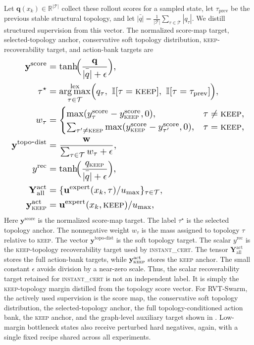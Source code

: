 \documentclass{ieeeaccess}
\DeclareMathOperator*{\argmax}{arg\,max}
\newcommand{\R}{\mathbb{R}}
\newcommand{\cT}{\mathcal{T}}
\newcommand{\bfu}{\mathbf{u}}
\begin{document}
Let $\mathbf{q}(x_k)\in\R^{|\cT|}$ collect these rollout scores for a sampled state, let $\tau_{\mathrm{prev}}$ be the previous stable structural topology, and let $\bar{|q|}=\frac{1}{|\cT|}\sum_{\tau\in\cT}|q_\tau|$. We distill structured supervision from this vector. The normalized score-map target, selected-topology anchor, conservative soft topology distribution, \textsc{keep}-recoverability target, and action-bank targets are
\begin{equation}
\resizebox{0.98\columnwidth}{!}{$\displaystyle
\begin{aligned}
\mathbf{y}^{\mathrm{score}}
&= \tanh\!\Bigl(\frac{\mathbf{q}}{\bar{|q|}+\epsilon}\Bigr), \\
\tau^\star &= \argmax_{\tau\in\cT}^{\mathrm{lex}}
\Bigl(q_\tau,\ \mathbb{I}[\tau=\textsc{keep}],\ \mathbb{I}[\tau=\tau_{\mathrm{prev}}]\Bigr), \\
w_\tau &=
\begin{cases}
\max(y^{\mathrm{score}}_\tau - y^{\mathrm{score}}_{\textsc{keep}}, 0), & \tau \neq \textsc{keep},\\
\sum_{\tau' \neq \textsc{keep}} \max(y^{\mathrm{score}}_{\textsc{keep}} - y^{\mathrm{score}}_{\tau'}, 0), & \tau = \textsc{keep},
\end{cases} \\
\mathbf{y}^{\mathrm{topo\mbox{-}dist}}
&= \frac{\mathbf{w}}{\sum_{\tau\in\cT} w_\tau + \epsilon}, \\
y^{\mathrm{rec}}
&= \tanh\!\Bigl(\frac{q_{\textsc{keep}}}{\bar{|q|}+\epsilon}\Bigr), \\
\mathbf{Y}^{\mathrm{act}}_{\mathrm{all}}
&= \{\bfu^{\mathrm{expert}}(x_k,\tau)/u_{\max}\}_{\tau\in\cT}, \\
\mathbf{y}^{\mathrm{act}}_{\textsc{keep}}
&= \bfu^{\mathrm{expert}}(x_k,\textsc{keep}) / u_{\max},
\label{eq:targets}
\end{aligned}
$}
\end{equation}
Here $\mathbf{y}^{\mathrm{score}}$ is the normalized score-map target.
The label $\tau^\star$ is the selected topology anchor.
The nonnegative weight $w_\tau$ is the mass assigned to topology $\tau$
relative to \textsc{keep}. The vector
$\mathbf{y}^{\mathrm{topo\mbox{-}dist}}$ is the soft topology target.
The scalar $y^{\mathrm{rec}}$ is the \textsc{keep}-topology
recoverability target used by \textsc{instant\_cert}. The tensor
$\mathbf{Y}^{\mathrm{act}}_{\mathrm{all}}$ stores the full action-bank
targets, while $\mathbf{y}^{\mathrm{act}}_{\textsc{keep}}$ stores the
\textsc{keep} anchor. The small constant $\epsilon$ avoids division by
a near-zero scale. Thus, the scalar recoverability target retained for
\textsc{instant\_cert} is not an independent label. It is simply the
\textsc{keep}-topology margin distilled from the topology score vector.
For RVT-Swarm, the actively used supervision is the score map, the
conservative soft topology distribution, the selected-topology anchor, the full topology-conditioned action bank, the \textsc{keep} anchor, and the graph-level auxiliary target shown in .
Low-margin bottleneck states also receive perturbed hard negatives,
again, with a single fixed recipe shared across all experiments.
\end{document}
